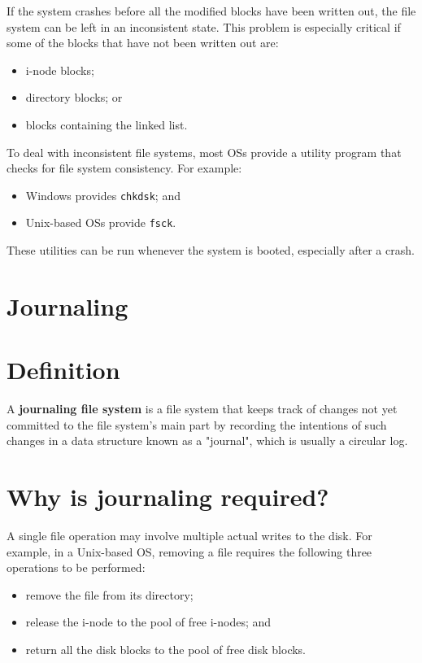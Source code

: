 \documentclass[a4paper]{systems-software}
\begin{document}
If the system crashes before all the modified blocks have been written out, the file system can be left in an inconsistent state. This problem is especially critical if some of the blocks that have not been written out are:
\begin{itemize}
	\item i-node blocks;
	\item directory blocks; or
	\item blocks containing the linked list.
\end{itemize}

To deal with inconsistent file systems, most OSs provide a utility program that checks for file system consistency. For example:
\begin{itemize}
	\item Windows provides \texttt{chkdsk}; and
	\item Unix-based OSs provide \texttt{fsck}.
\end{itemize}

These utilities can be run whenever the system is booted, especially after a crash.


\newpage

\section{Journaling}

\section*{Definition}

A \textbf{journaling file system} is a file system that keeps track of changes not yet committed to the file system's main part by recording the intentions of such changes in a data structure known as a "journal", which is usually a circular log.


\section*{Why is journaling required?}

A single file operation may involve multiple actual writes to the disk. For example, in a Unix-based OS, removing a file requires the following three operations to be performed:
\begin{itemize}
	\item remove the file from its directory;
	\item release the i-node to the pool of free i-nodes; and
	\item return all the disk blocks to the pool of free disk blocks.
\end{itemize}
\end{document}
